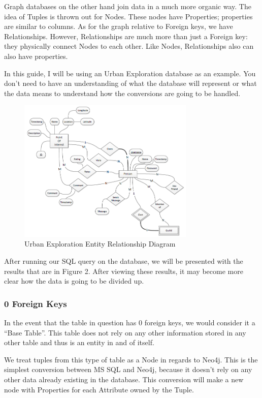 \documentclass{acm_proc_article-sp}
\begin{document}
Graph databases on the other hand join data in a much more organic way. The idea of Tuples is thrown out for Nodes. These nodes have Properties; properties are similar to columns. As for the graph relative to Foreign keys, we have Relationships. However, Relationships are much more than just a Foreign key: they physically connect Nodes to each other. Like Nodes, Relationships also can also have properties.

In this guide, I will be using an Urban Exploration database as an example. You don't need to have an understanding of what the database will represent or what the data means to understand how the conversions are going to be handled.

\begin{figure}
  \centering
  \includegraphics[width=0.75\textwidth]{Images/URBEX_ERD}
  \caption{Urban Exploration Entity Relationship Diagram}
\end{figure}

After running our SQL query on the database, we will be presented with the results that are in Figure 2. After viewing these results, it may become more clear how the data is going to be divided up. 

\subsubsection{0 Foreign Keys}

In the event that the table in question has 0 foreign keys, we would consider it a ``Base Table''. This table does not rely on any other information stored in any other table and thus is an entity in and of itself.

We treat tuples from this type of table as a Node in regards to Neo4j. This is the simplest conversion between MS SQL and Neo4j, because it doesn't rely on any other data already existing in the database. This conversion will make a new node with Properties for each Attribute owned by the Tuple.
\end{document}
